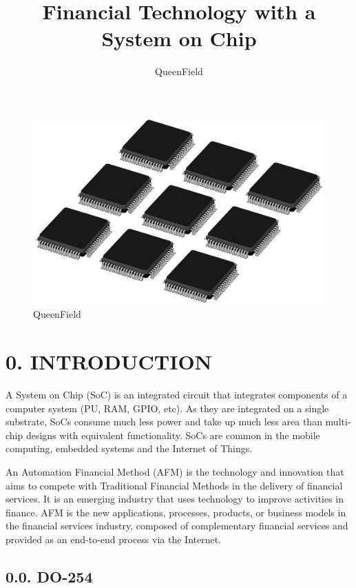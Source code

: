 \documentclass[]{article}
\title{Financial Technology with a System on Chip}
\author{QueenField}
\date{}
\begin{document}
\maketitle

\begin{figure}
\centering
\includegraphics{../icon.jpg}
\caption{QueenField}
\end{figure}

\section{0. INTRODUCTION}\label{introduction}

A System on Chip (SoC) is an integrated circuit that integrates
components of a computer system (PU, RAM, GPIO, etc). As they are
integrated on a single substrate, SoCs consume much less power and take
up much less area than multi-chip designs with equivalent functionality.
SoCs are common in the mobile computing, embedded systems and the
Internet of Things.

An Automation Financial Method (AFM) is the technology and innovation
that aims to compete with Traditional Financial Methods in the delivery
of financial services. It is an emerging industry that uses technology
to improve activities in finance. AFM is the new applications,
processes, products, or business models in the financial services
industry, composed of complementary financial services and provided as
an end-to-end process via the Internet.

\subsection{0.0. DO-254}\label{do-254}
\end{document}
